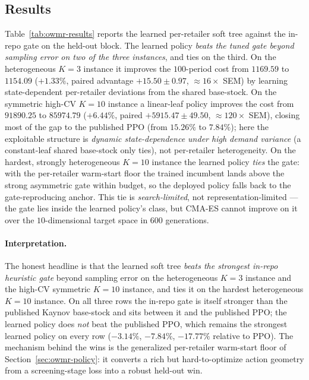 \subsection{Results}
\label{sec:owmr-results}

Table~\ref{tab:owmr-results} reports the learned per-retailer soft tree against the in-repo gate on
the held-out block. The learned policy \emph{beats the tuned gate beyond sampling error on two of the
three instances}, and ties on the third. On the heterogeneous $K{=}3$ instance it improves the
$100$-period cost from $1169.59$ to $1154.09$ ($+1.33\%$, paired advantage $+15.50\pm0.97$,
$\approx16\times$ SEM) by learning state-dependent per-retailer deviations from the shared base-stock.
On the symmetric high-CV $K{=}10$ instance a linear-leaf policy improves the cost from $91890.25$ to
$85974.79$ ($+6.44\%$, paired $+5915.47\pm49.50$, $\approx120\times$ SEM), closing most of the gap to
the published PPO (from $15.26\%$ to $7.84\%$); here the exploitable structure is \emph{dynamic
state-dependence under high demand variance} (a constant-leaf shared base-stock only ties), not
per-retailer heterogeneity. On the hardest, strongly heterogeneous $K{=}10$ instance the learned
policy \emph{ties} the gate: with the per-retailer warm-start floor the trained incumbent lands above
the strong asymmetric gate within budget, so the deployed policy falls back to the gate-reproducing
anchor. This tie is \emph{search-limited}, not representation-limited --- the gate lies inside the
learned policy's class, but CMA-ES cannot improve on it over the $10$-dimensional target space in
$600$ generations.

\paragraph{Interpretation.}
The honest headline is that the learned soft tree \emph{beats the strongest in-repo heuristic gate}
beyond sampling error on the heterogeneous $K{=}3$ instance and the high-CV symmetric $K{=}10$
instance, and ties it on the hardest heterogeneous $K{=}10$ instance. On all three rows the in-repo
gate is itself stronger than the published Kaynov base-stock and sits between it and the published
PPO; the learned policy does \emph{not} beat the published PPO, which remains the strongest learned
policy on every row ($-3.14\%$, $-7.84\%$, $-17.77\%$ relative to PPO). The mechanism behind the wins
is the generalized per-retailer warm-start floor of Section~\ref{sec:owmr-policy}: it converts a rich
but hard-to-optimize action geometry from a screening-stage loss into a robust held-out win.

